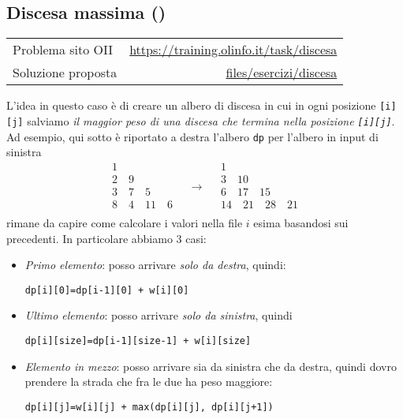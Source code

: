 \subsection{Discesa massima {()}}
\label{sol discesa}
\begin{center}
	\begin{tabularx}{\textwidth}{X r}
		\toprule
		Problema sito OII  & \url{https://training.olinfo.it/task/discesa}                         \\
		Soluzione proposta & \ttfamily\href{run:./files/esercizi/discesa/}{files/esercizi/discesa} \\
		\bottomrule
	\end{tabularx}
\end{center}
L'idea in questo caso è di creare un albero di discesa in cui in ogni posizione \verb|[i][j]| salviamo \textit{il maggior peso di una discesa che termina nella posizione \texttt{[i][j]}}.
\vskip3mm
Ad esempio, qui sotto è riportato a destra l'albero \verb|dp| per l'albero in input di sinistra
\[
	\begin{array}{c}
		1                       \\
		2 \quad  9              \\
		3 \quad 7\quad 5        \\
		8 \quad4\quad 11\quad 6 \\
	\end{array}
	\quad
	\rightarrow
	\quad
	\begin{array}{c}
		1                            \\
		3 \quad  10                  \\
		6 \quad 17\quad 15           \\
		14 \quad 21\quad 28 \quad 21 \\
	\end{array}
\]
rimane da capire come calcolare i valori nella file $ i $ esima basandosi sui precedenti. In particolare abbiamo 3 casi:
\begin{itemize}
	\item \textit{Primo elemento}: posso arrivare \textit{solo da destra}, quindi:
	      \begin{center}
		      \verb|dp[i][0]=dp[i-1][0] + w[i][0]|
	      \end{center}
	\item \textit{Ultimo elemento}: posso arrivare \textit{solo da sinistra}, quindi
	      \begin{center}
		      \verb|dp[i][size]=dp[i-1][size-1] + w[i][size]|
	      \end{center}
	\item \textit{Elemento in mezzo}: posso arrivare sia da sinistra che da destra, quindi dovro prendere la strada che fra le due ha peso maggiore:
	      \begin{center}
		      \verb|dp[i][j]=w[i][j] + max(dp[i][j], dp[i][j+1])|
	      \end{center}
\end{itemize}
